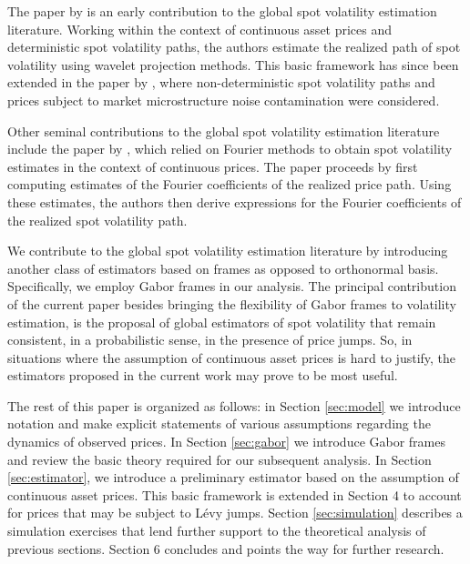 \documentclass[a4paper, 12pt]{article}
\newcommand{\levy}{L\'evy\xspace}
\begin{document}
The paper by \cite{GenonCatalot1992} is an early contribution to the global spot volatility estimation literature. Working within the context of continuous asset prices and deterministic spot volatility paths, the authors  estimate  the realized path of spot volatility using wavelet projection methods.  This basic framework  has since  been extended in the paper by  \cite{Hoffmann2012}, where non-deterministic spot volatility paths and prices subject to market microstructure noise contamination were considered.

Other  seminal contributions to the global spot volatility estimation literature  include the paper by \cite{Malliavin2002}, which relied on Fourier methods to obtain spot volatility estimates in the context of continuous prices. The paper proceeds by  first computing estimates of the Fourier coefficients of the realized price path. Using these estimates, the authors  then derive expressions for  the Fourier coefficients of the realized spot volatility path.     

We contribute to the global spot volatility estimation literature by introducing another class of estimators based on frames as opposed to orthonormal basis. Specifically, we employ Gabor frames in our analysis.  The principal contribution of the current paper besides bringing the flexibility of Gabor frames to volatility estimation, is the proposal of global estimators of spot volatility that remain consistent, in a probabilistic sense,  in the presence of price jumps. So, in situations where the assumption of  continuous asset prices is hard to justify, the  estimators proposed in the current work may prove to be most useful.  

The rest of this paper is organized as follows: in Section \ref{sec:model} we introduce notation and make explicit statements of various assumptions regarding the dynamics  of  observed prices. In  Section \ref{sec:gabor} we introduce   Gabor frames and review the basic theory required for our subsequent analysis. In  Section \ref{sec:estimator}, we introduce a preliminary estimator based on the assumption of continuous asset prices. This basic framework is extended  in  Section 4 to account for prices that  may be subject to \levy jumps.     Section \ref{sec:simulation} describes a simulation exercises that lend further support to the theoretical analysis of  previous sections. Section 6 concludes and points the way for further research. 

\end{document}

